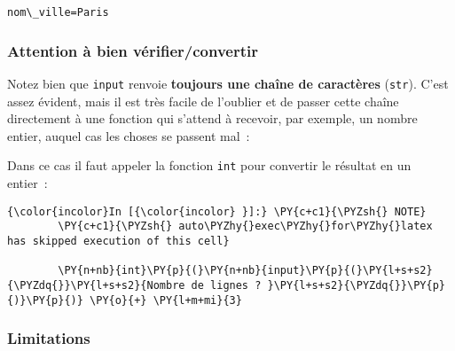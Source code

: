     \begin{Verbatim}[commandchars=\\\{\}]
nom\_ville=Paris

    \end{Verbatim}

    \hypertarget{attention-uxe0-bien-vuxe9rifierconvertir}{%
\subsubsection{Attention à bien
vérifier/convertir}\label{attention-uxe0-bien-vuxe9rifierconvertir}}

    Notez bien que \texttt{input} renvoie \textbf{toujours une chaîne de
caractères} (\texttt{str}). C'est assez évident, mais il est très facile
de l'oublier et de passer cette chaîne directement à une fonction qui
s'attend à recevoir, par exemple, un nombre entier, auquel cas les
choses se passent mal~:

    \begin{Shaded}
\begin{Highlighting}[]
\OperatorTok{>>>} \NormalTok{(}\NormalTok{) }\OperatorTok{+} 
\NormalTok{, } \OperatorTok{<}\OperatorTok{>}
\NormalTok{, } 
\end{Highlighting}
\end{Shaded}

    Dans ce cas il faut appeler la fonction \texttt{int} pour convertir le
résultat en un entier~:

    \begin{Verbatim}[commandchars=\\\{\}]
{\color{incolor}In [{\color{incolor} }]:} \PY{c+c1}{\PYZsh{} NOTE}
        \PY{c+c1}{\PYZsh{} auto\PYZhy{}exec\PYZhy{}for\PYZhy{}latex has skipped execution of this cell}
        
        \PY{n+nb}{int}\PY{p}{(}\PY{n+nb}{input}\PY{p}{(}\PY{l+s+s2}{\PYZdq{}}\PY{l+s+s2}{Nombre de lignes ? }\PY{l+s+s2}{\PYZdq{}}\PY{p}{)}\PY{p}{)} \PY{o}{+} \PY{l+m+mi}{3}
\end{Verbatim}


    \hypertarget{limitations}{%
\subsubsection{Limitations}\label{limitations}}

